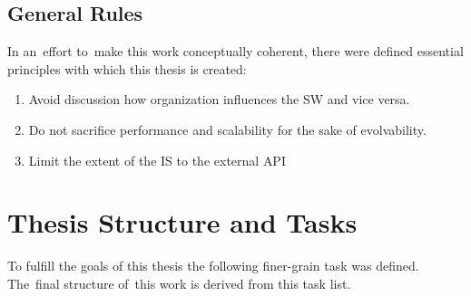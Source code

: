 \documentclass[thesis=M,english,hidelinks]{FITthesis}[2012/10/20]
\begin{document}
\subsection{General Rules}
In an~effort to~make this work conceptually coherent, there were defined essential principles with which this thesis is created:
\begin{enumerate}
    \item Avoid discussion how organization influences the \acrshort{SW} and vice versa.
    \item Do not sacrifice performance and scalability for the sake of evolvability.
    \item Limit the extent of the \acrshort{IS} to the external \acrshort{API} 
\end{enumerate}

\section{Thesis Structure and Tasks}
To fulfill the goals of this thesis the following finer-grain task was defined. The~final structure of~this work is derived from this task list.
\end{document}
